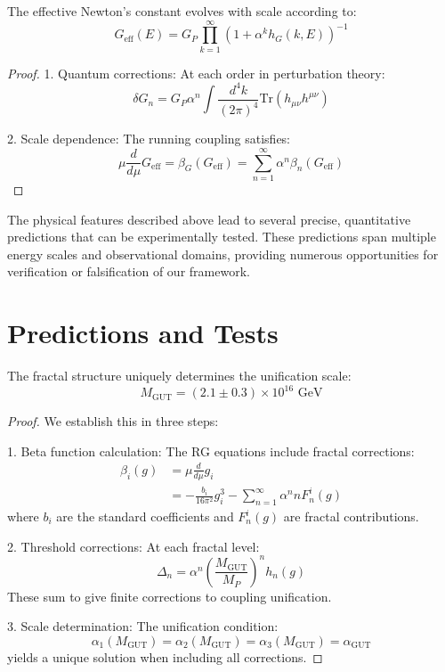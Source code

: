 \documentclass{article}
\begin{document}
\begin{theorem}
The effective Newton's constant evolves with scale according to:
\[
G_{\text{eff}}(E) = G_P \prod_{k=1}^{\infty} (1 + \alpha^k h_G(k,E))^{-1}
\]
\end{theorem}

\begin{proof}
1. Quantum corrections:
   At each order in perturbation theory:
   \[
   \delta G_n = G_P \alpha^n \int \frac{d^4k}{(2\pi)^4} \text{Tr}(h_{\mu\nu}h^{\mu\nu})
   \]

2. Scale dependence:
   The running coupling satisfies:
   \[
   \mu\frac{d}{d\mu}G_{\text{eff}} = \beta_G(G_{\text{eff}}) = \sum_{n=1}^{\infty} \alpha^n \beta_n(G_{\text{eff}})
   \]
\end{proof}

The physical features described above lead to several precise, quantitative predictions that can be experimentally tested. These predictions span multiple energy scales and observational domains, providing numerous opportunities for verification or falsification of our framework.

\section{Predictions and Tests}

\label{sec:predictions}

\begin{theorem}
The fractal structure uniquely determines the unification scale:
\[
M_{\text{GUT}} = (2.1 \pm 0.3) \times 10^{16} \text{ GeV}
\]
\end{theorem}

\begin{proof}
We establish this in three steps:

1. Beta function calculation:
   The RG equations include fractal corrections:
   \begin{align*}
   \beta_i(g) &= \mu\frac{d}{d\mu}g_i \\
   &= -\frac{b_i}{16\pi^2}g_i^3 - \sum_{n=1}^{\infty} \alpha^n n F_n^i(g)
   \end{align*}
   where $b_i$ are the standard coefficients and $F_n^i(g)$ are fractal contributions.

2. Threshold corrections:
   At each fractal level:
   \[
   \Delta_n = \alpha^n \left(\frac{M_{\text{GUT}}}{M_P}\right)^n h_n(g)
   \]
   These sum to give finite corrections to coupling unification.

3. Scale determination:
   The unification condition:
   \[
   \alpha_1(M_{\text{GUT}}) = \alpha_2(M_{\text{GUT}}) = \alpha_3(M_{\text{GUT}}) = \alpha_{\text{GUT}}
   \]
   yields a unique solution when including all corrections.
\end{proof}
\end{document}
